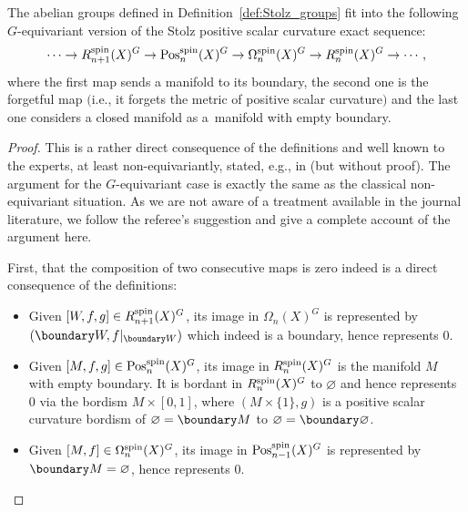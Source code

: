 \begin{Proposition}\label{prop:Stolz_seq}
		The abelian groups defined in Definition~{\rm\ref{def:Stolz_groups}} fit into the
		following $G$-equivari\-ant version of the Stolz positive scalar curvature exact sequence:
		\[
			\cdots \to R^{\rm spin}_{n+1}(X)^{G} \to \mathrm{Pos}^{\rm spin}_{n}(X)^{G} \to \Omega^{\rm spin}_{n}(X)^{G} \to R^{\rm spin}_{n}(X)^{G} \to \cdots,
		\]
		where the first map sends a manifold to its boundary, the second one
		is the forgetful map $($i.e., it forgets the metric of positive scalar curvature$)$
		and the last one considers a closed manifold as a~manifold with empty boundary.
	\end{Proposition}
	\begin{proof}
		This is a rather direct consequence of the definitions and well known to the
		experts, at least non-equivariantly, stated, e.g., in \cite[long exact sequence~(4.4)]{Stolz} (but
		without proof). The
		argument for the
		$G$-equivariant case is exactly the same as the classical non-equivariant
		situation. As we are not aware of a treatment available in the journal
		literature, we follow the referee's suggestion and give a complete account
		of the argument here.
		
		First, that the composition of two consecutive maps is zero indeed is a
		direct consequence of the definitions:
		\begin{itemize}\itemsep=0pt
			\item Given $[W,f,g]\in R^{\rm spin}_{n+1}(X)^G$, its image in $\Omega_n(X)^G$ is
			represented by $(\boundary W,f|_{\boundary W})$ which indeed is a boundary, hence represents
			$0$.
			\item Given $[M,f,g]\in \mathrm{Pos}_n^{\rm spin}(X)^G$, its image in $R^{\rm spin}_n(X)^G$ is
			the manifold $M$ with empty boundary. It is bordant in $R^{\rm spin}_n(X)^G$
			to $\varnothing$ and hence represents $0$ via the
			bordism $M\times [0,1]$, where $(M\times \{1\},g)$ is a positive scalar curvature bordism of
			$\varnothing =\boundary M$ to $\varnothing=\boundary\varnothing$.
			\item Given $[M,f]\in \Omega^{\rm spin}_n(X)^G$, its image in
			$\mathrm{Pos}_{n-1}^{\rm spin}(X)^G$ is represented by $\boundary M=\varnothing$, hence
			represents $0$.
		\end{itemize}
		

\end{proof}
